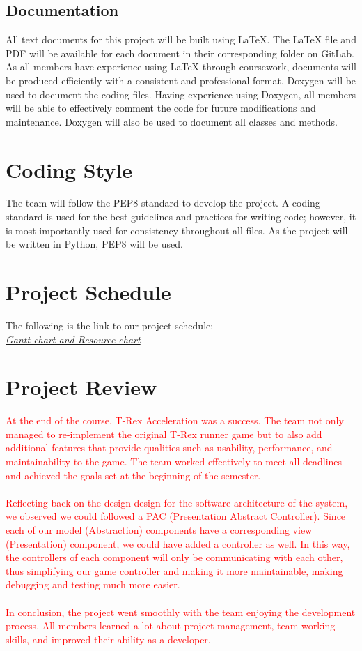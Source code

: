\documentclass{article}
\begin{document}
\subsection{Documentation}
All text documents for this project will be built using LaTeX. The LaTeX file and PDF will be available for each document in their corresponding folder on GitLab. As all members have experience using LaTeX through coursework, documents will be produced efficiently with a consistent and professional format. Doxygen will be used to document the coding files. Having experience using Doxygen, all members will be able to effectively comment the code for future modifications and maintenance. Doxygen will also be used to document all classes and methods. 

\section{Coding Style}
The team will follow the PEP8 standard to develop the project. A coding standard is used for the best guidelines and practices for writing code; however, it is most importantly used for consistency throughout all files. As the project will be written in Python, PEP8 will be used.   

\section{Project Schedule}
The following is the link to our project schedule:\\
\href{https://gitlab.cas.mcmaster.ca/se_3xa3_l3g15/se_3xa3_project/-/tree/master/ProjectSchedule/GanttT-Rex.gan}{\textit{Gantt chart and Resource chart}}

\section{Project Review}
\textcolor{red}{At the end of the course, T-Rex Acceleration was a success. The team not only managed to re-implement the original T-Rex runner game but to also add additional features that provide qualities such as usability, performance, and maintainability to the game. The team worked effectively to meet all deadlines and achieved the goals set at the beginning of the semester. \\\\}
\textcolor{red}{Reflecting back on the design design for the software architecture of the system, we observed we could followed a PAC (Presentation Abstract Controller). Since each of our model (Abstraction) components have a corresponding view (Presentation) component, we could have added a controller as well. In this way, the controllers of each component will only be communicating with each other, thus simplifying our game controller and making it more maintainable, making debugging and testing much more easier. }\\\\
\textcolor{red}{In conclusion, the project went smoothly with the team enjoying the development process. All members learned a lot about project management, team working skills, and improved their ability as a developer.}
\end{document}
